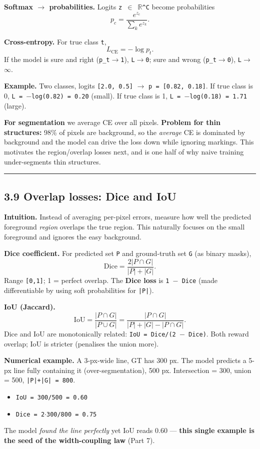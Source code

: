 \documentclass[11pt]{article}
\begin{document}
\textbf{Softmax $\rightarrow$ probabilities.} Logits \texttt{z $\in$ $\mathbb{R}$\textasciicircum{}C} become probabilities \[p_c = \frac{e^{z_c}}{\sum_{k} e^{z_k}}.\]

\textbf{Cross-entropy.} For true class \texttt{t}, \[L_\text{CE} = -\log p_t.\] If the model is sure and right (\texttt{p\_t$\rightarrow$1}), \texttt{L$\rightarrow$0}; sure and wrong (\texttt{p\_t$\rightarrow$0}), \texttt{L$\rightarrow$$\infty$}.

\textbf{Example.} Two classes, logits \texttt{[2.0, 0.5]} $\rightarrow$ \texttt{p = [0.82, 0.18]}. If true class is 0, \texttt{L = $-$log(0.82) = 0.20} (small). If true class is 1, \texttt{L = $-$log(0.18) = 1.71} (large).

\textbf{For segmentation} we average CE over all pixels. \textbf{Problem for thin structures:} 98\% of pixels are background, so the \textit{average} CE is dominated by background and the model can drive the loss down while ignoring markings. This motivates the region/overlap losses next, and is one half of why naive training under-segments thin structures.

\vspace{3pt}\hrule\vspace{3pt}
\subsection*{3.9 Overlap losses: Dice and IoU}

\textbf{Intuition.} Instead of averaging per-pixel errors, measure how well the predicted foreground \textit{region} overlaps the true region. This naturally focuses on the small foreground and ignores the easy background.

\textbf{Dice coefficient.} For predicted set \texttt{P} and ground-truth set \texttt{G} (as binary masks), \[\text{Dice} = \frac{2|P\cap G|}{|P| + |G|}.\] Range \texttt{[0,1]}; 1 = perfect overlap. The \textbf{Dice loss} is \texttt{1 $-$ Dice} (made differentiable by using soft probabilities for \texttt{|P|}).

\textbf{IoU (Jaccard).} \[\text{IoU} = \frac{|P\cap G|}{|P\cup G|} = \frac{|P\cap G|}{|P| + |G| - |P\cap G|}.\] Dice and IoU are monotonically related: \texttt{IoU = Dice/(2 $-$ Dice)}. Both reward overlap; IoU is stricter (penalises the union more).

\textbf{Numerical example.} A 3-px-wide line, GT has 300 px. The model predicts a 5-px line fully containing it (over-segmentation), 500 px. Intersection = 300, union = 500, \texttt{|P|+|G| = 800}.
\begin{itemize}\setlength{\itemsep}{1pt}
\item \texttt{IoU = 300/500 = 0.60}
\item \texttt{Dice = 2$\cdot$300/800 = 0.75}
\end{itemize}
The model \textit{found the line perfectly} yet IoU reads 0.60 --- \textbf{this single example is the seed of the width-coupling law} (Part 7).
\end{document}
